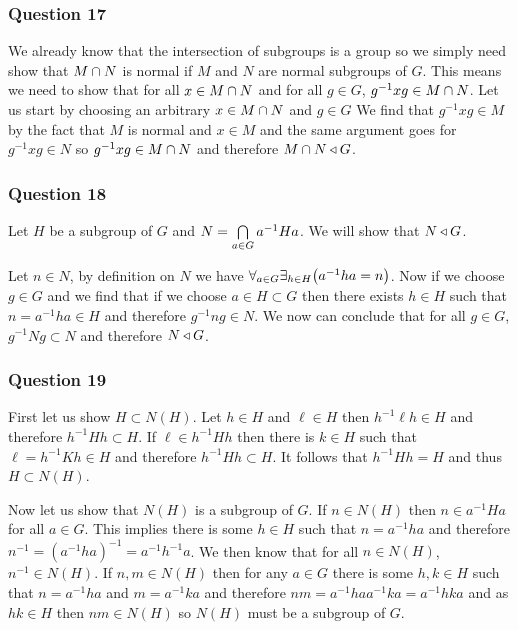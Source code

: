 \documentclass{article}
\begin{document}
\subsubsection{Question 17}

We already know that the intersection of subgroups is a group so we simply need show that $M\cap N$ is normal if $M$ and $N$ are normal subgroups of $G$. This means we need to show that for all $x\in M\cap N$ and for all $g \in G$, $g^{-1}xg \in M\cap N$. Let us start by choosing an arbitrary $x \in M\cap N$ and $g\in G$ We find that $g^{-1}xg \in M$ by the fact that $M$ is normal and $x \in M$ and the same argument goes for $g^{-1}xg \in N$ so $g^{-1}xg \in M\cap N$ and therefore $M\cap N\triangleleft G$.

\subsubsection{Question 18}

Let $H$ be a subgroup of $G$ and $N = \bigcap\limits_{a\in G}^{}  {a^{-1}Ha} $. We will show that $N\triangleleft G$.

Let $n\in N$, by definition on $N$ we have $\forall_{a\in G} {\exists_{h\in H} {\left(a^{-1}ha = n\right)} } $. Now if we choose $g\in G$ and we find that if we choose $a \in H\subset G$ then there exists $h \in H$ such that $n = a^{-1}ha \in H$ and therefore $g^{-1}ng \in N$. We now can conclude that for all $g \in G$, $g^{-1}Ng \subset N$ and therefore $N\triangleleft G$.

\subsubsection{Question 19}

 First let us show $H\subset N(H)$. Let $h \in H$ and $\ell \in H$ then $h^{-1}\ell h \in H$ and therefore $h^{-1}Hh\subset H$. If $\ell \in h^{-1}Hh$ then there is $k \in H$ such that $\ell=h^{-1}Kh \in H$ and therefore $h^{-1}Hh \subset H$. It follows that $h^{-1}Hh = H$ and thus $H \subset N(H)$.

Now let us show that $N(H)$ is a subgroup of $G$. If $n \in N(H)$ then $n \in a^{-1}Ha$ for all $a \in G$. This implies there is some $h \in H$ such that $n = a^{-1}ha$ and therefore $n^{-1} = \left(a^{-1}ha\right)^{-1} = a^{-1}h^{-1}a$. We then know that for all $n \in N(H)$, $n^{-1}\in N(H)$. If $n,m\in N(H)$ then for any $a\in G$ there is some $h,k\in H$ such that $n = a^{-1}ha$ and $m = a^{-1}ka$ and therefore $nm = a^{-1}haa^{-1}ka = a^{-1}hka$ and as $hk\in H$ then $nm \in N(H)$ so $N(H)$ must be a subgroup of $G$.
\end{document}
